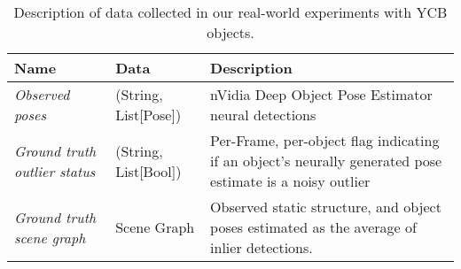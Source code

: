 \begin{table}[H]
\begin{tabular}{|p{2.5cm}|p{4cm}|p{7.5cm}|}
\hline
\textbf{Name}               & \textbf{Data}          & \textbf{Description} \\
\hline
\textit{Observed poses}              & (String, List[Pose]) & nVidia Deep Object Pose Estimator neural detections \\
\hline
\textit{Ground truth outlier status} & (String, List[Bool]) & Per-Frame, per-object flag indicating if an object's neurally generated pose estimate is a noisy outlier \\
\hline
\textit{Ground truth scene graph}    & Scene Graph          & Observed static structure, and object poses estimated as the average of inlier detections. \\
\hline
\end{tabular}
\caption{Description of data collected in our real-world experiments with YCB objects.}
\label{table:inhouseDatasetSpec}
\end{table}

